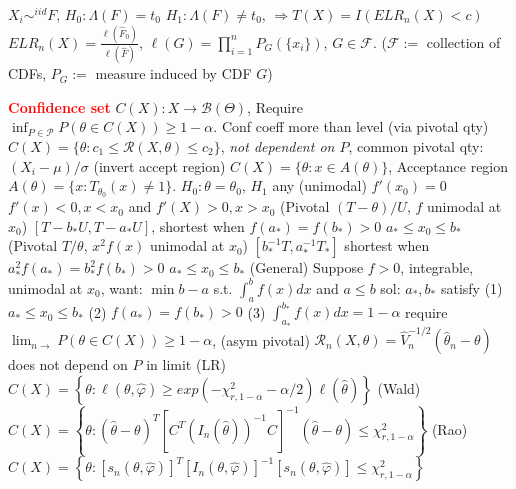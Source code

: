 \documentclass{article}
\renewcommand{\section}[1]{\textcolor{red}{\textbf{#1}}}
\renewcommand{\subsection}[1]{\text{\hl{[#1]}}}
\newcommand{\compact}{\nolinebreak}
\begin{document}
\subsection{Empirical LR}
$X_i \sim^{iid} F$,
$H_0: \Lambda(F)=t_0$ $H_1: \Lambda(F) \neq t_0$,
$\Rightarrow T(X) = I(ELR_n(X) < c)$
$ELR_n(X) = \frac{\ell(\hat{F}_0)}{\ell(\hat{F})}$,
$\ell(G) = \prod_{i=1}^n P_G(\{x_i\})$, $G \in \mathcal{F}$.
($\mathcal{F} :=$ collection of CDFs, $P_G :=$ measure induced by CDF $G$)

\section{Confidence set}
$C(X): X \rightarrow \mathcal{B}(\Theta)$,
Require $\inf_{P\in\mathcal{P}} P(\theta\in C(X)) \geq 1 - \alpha$.
Conf coeff more than level
(via pivotal qty)
$C(X) = \{\theta: c_1 \leq \mathcal{R}(X, \theta) \leq c_2\}$,
\textit{not dependent on $P$}, common pivotal qty: $(X_i-\mu)/\sigma$
(invert accept region)
$C(X) = \{\theta: x\in A(\theta)\}$, Acceptance region $A(\theta)=\{x:
    T_{\theta_0}(x) \neq 1\}$.
$H_0: \theta = \theta_0$, $H_1$ any
\compact
\subsection{Shortest CI}
(unimodal)
$f'(x_0) = 0$ $f'(x)<0, x < x_0$ and $f'(X)>0, x > x_0$
(Pivotal $(T-\theta)/U$, $f$ unimodal at $x_0$)
$[T - b_*U, T-a_* U]$, shortest when
$f(a_*) = f(b_*) > 0$
$a_* \leq x_0 \leq b_*$
(Pivotal $T/\theta$, $x^2f(x)$ unimodal at $x_0$)
$[b_*^{-1}T, a_*^{-1}T_*]$ shortest when
$a^2_*f(a_*) = b^2_*f(b_*) > 0$
$a_* \leq x_0 \leq b_*$
(General)
Suppose $f > 0$, integrable, unimodal at $x_0$,
want: $\min b - a$ s.t.
$\int_a^b f(x) dx$ and $a \leq b$
sol: $a_*, b_*$ satisfy
(1) $a_* \leq x_0 \leq b_*$
(2) $f(a_*) = f(b_*) > 0$
(3) $\int_{a_*}^{b_*} f(x) dx = 1- \alpha$
\compact
\subsection{asym}
require $\lim_{n\rightarrow}P(\theta\in C(X)) \geq 1 - \alpha$,
(asym pivotal)
$\mathcal{R}_n(X, \theta) = \hat V_n^{-1/2} (\hat\theta_n - \theta)$
does not depend on $P$ in limit
(LR)
$C(X) = \left\{\theta: \ell(\theta, \hat\varphi) \geq
    exp(-\chi_{r, 1-\alpha}^2-\alpha/2)\ell(\hat\theta)\right\}$
(Wald)
$C(X) = \left\{
    \theta: (\hat\theta - \theta)^T \left[
        C^T \left(
        I_n(\hat\theta)
        \right)^{-1}
        C
        \right]^{-1}
    (\hat\theta - \theta) \leq \chi_{r, 1-\alpha}^2
    \right\}$
(Rao)
$C(X) = \left\{
    \theta:
    \left[ s_n(\theta, \hat\varphi) \right]^T
    \left[ I_n(\theta, \hat\varphi) \right]^{-1}
    \left[ s_n(\theta, \hat\varphi) \right]
    \leq \chi_{r, 1-\alpha}^2
    \right\}$
\end{document}
